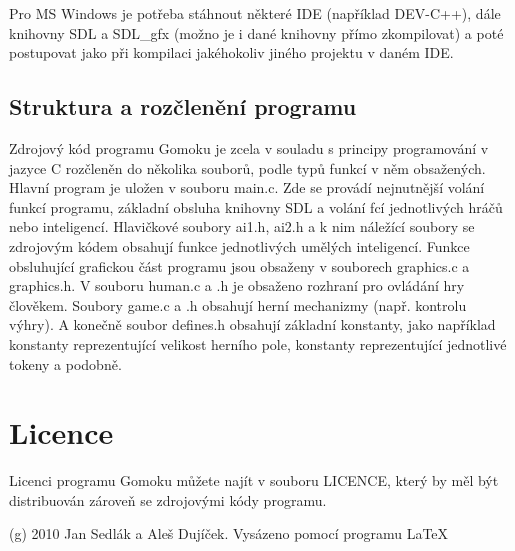\documentclass[a4paper,11pt,titlepage]{article}
\begin{document}
Pro MS Windows je potřeba stáhnout některé IDE (například DEV-C++), dále knihovny SDL a SDL\_gfx (možno je i dané knihovny přímo zkompilovat) a poté postupovat jako při kompilaci jakéhokoliv jiného projektu v daném IDE.
\subsection{Struktura a rozčlenění programu}
Zdrojový kód programu Gomoku je zcela v souladu s principy programování v jazyce C rozčleněn do několika souborů, podle typů funkcí v něm ob\-sa\-že\-ných. Hlavní program je uložen v souboru main.c. Zde se provádí nejnutnější volání funkcí programu, základní obsluha knihovny SDL a volání fcí jednotlivých hráčů nebo inteligencí. Hlavičkové soubory ai1.h, ai2.h a k nim náležící soubory se zdrojovým kódem obsahují funkce jednotlivých umělých inteligencí. Funkce obsluhující grafickou část programu jsou obsaženy v souborech graphics.c a graphics.h. V souboru human.c a .h je obsaženo rozhraní pro ovládání hry člověkem. Soubory game.c a .h obsahují herní mechanizmy (např. kontrolu výhry). A konečně soubor defines.h obsahují základní konstanty, jako například konstanty reprezentující velikost herního pole, konstanty reprezentující jednotlivé tokeny a podobně.
\section{Licence}
Licenci programu Gomoku můžete najít v souboru LICENCE, který by měl být distribuován zároveň se zdrojovými kódy programu.

(g) 2010 Jan Sedlák a Aleš Dujíček. Vysázeno pomocí programu \LaTeX
\end{document}
